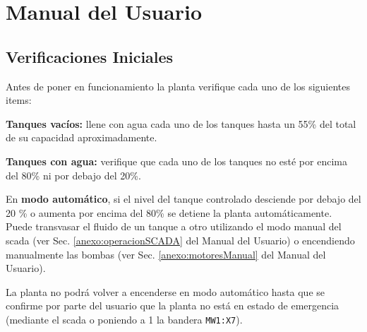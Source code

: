 \chapter{Manual del Usuario}
\label{anexo:manualUsuario}

\section{Verificaciones Iniciales}
\label{anexo:verificaciones}
Antes de poner en funcionamiento la planta verifique cada uno de los siguientes
items:

\begin{tcolorbox}[title=Nivel de agua]
\textbf{Tanques vacíos:} llene con agua cada uno de los tanques hasta un 55\%
del total de su capacidad aproximadamente.

\textbf{Tanques con agua:} verifique que cada uno de los tanques no esté por
encima del 80\% ni por debajo del 20\%.

\end {tcolorbox}
\begin{lattention}
En \textbf{modo automático}, si el nivel del tanque controlado desciende por
debajo del 20 \% o aumenta por encima del 80\% se detiene la planta 
automáticamente. Puede transvasar el fluido de un tanque a otro utilizando el
modo manual del \gls{scada} (ver Sec. \ref{anexo:operacionSCADA} del Manual
del Usuario) o encendiendo
manualmente las bombas (ver Sec. \ref{anexo:motoresManual} del Manual del
Usuario).

La planta no podrá volver a encenderse en modo automático hasta que se confirme
por parte del usuario que la planta no está en estado de emergencia (mediante el
\gls{scada} o poniendo a 1 la bandera \verb|MW1:X7|).
\end{lattention}

